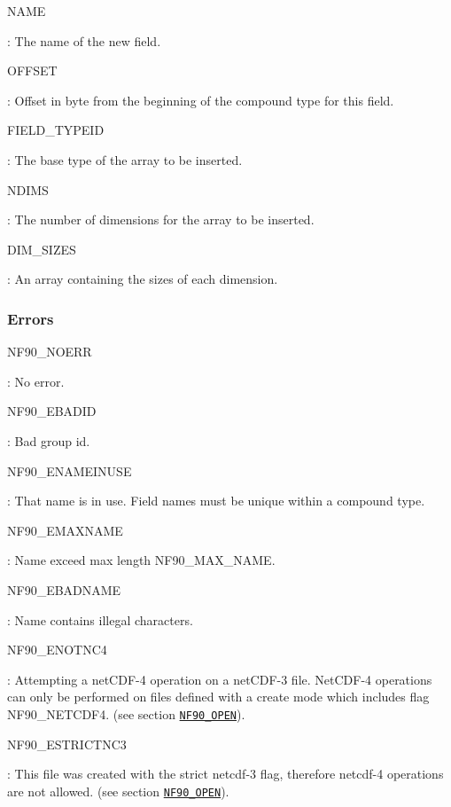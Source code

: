 {\ttfamily N\+A\+ME}

\+: The name of the new field.

{\ttfamily O\+F\+F\+S\+ET}

\+: Offset in byte from the beginning of the compound type for this field.

{\ttfamily F\+I\+E\+L\+D\+\_\+\+T\+Y\+P\+E\+ID}

\+: The base type of the array to be inserted.

{\ttfamily N\+D\+I\+MS}

\+: The number of dimensions for the array to be inserted.

{\ttfamily D\+I\+M\+\_\+\+S\+I\+Z\+ES}

\+: An array containing the sizes of each dimension.

\subsubsection*{Errors}

{\ttfamily N\+F90\+\_\+\+N\+O\+E\+RR}

\+: No error.

{\ttfamily N\+F90\+\_\+\+E\+B\+A\+D\+ID}

\+: Bad group id.

{\ttfamily N\+F90\+\_\+\+E\+N\+A\+M\+E\+I\+N\+U\+SE}

\+: That name is in use. Field names must be unique within a compound type.

{\ttfamily N\+F90\+\_\+\+E\+M\+A\+X\+N\+A\+ME}

\+: Name exceed max length N\+F90\+\_\+\+M\+A\+X\+\_\+\+N\+A\+ME.

{\ttfamily N\+F90\+\_\+\+E\+B\+A\+D\+N\+A\+ME}

\+: Name contains illegal characters.

{\ttfamily N\+F90\+\_\+\+E\+N\+O\+T\+N\+C4}

\+: Attempting a net\+C\+D\+F-\/4 operation on a net\+C\+D\+F-\/3 file. Net\+C\+D\+F-\/4 operations can only be performed on files defined with a create mode which includes flag N\+F90\+\_\+\+N\+E\+T\+C\+D\+F4. (see section \href{#NF90_005fOPEN}{\tt N\+F90\+\_\+\+O\+P\+EN}).

{\ttfamily N\+F90\+\_\+\+E\+S\+T\+R\+I\+C\+T\+N\+C3}

\+: This file was created with the strict netcdf-\/3 flag, therefore netcdf-\/4 operations are not allowed. (see section \href{#NF90_005fOPEN}{\tt N\+F90\+\_\+\+O\+P\+EN}).

